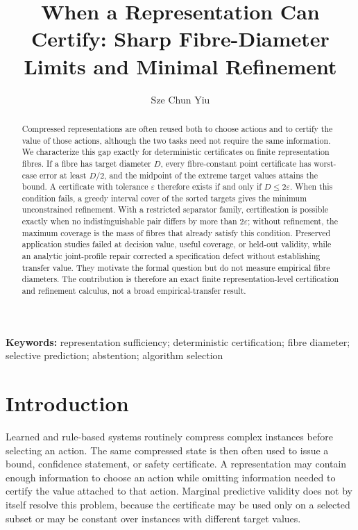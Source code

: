 \documentclass[10pt]{article}
\title{When a Representation Can Certify: Sharp Fibre-Diameter Limits and Minimal Refinement}
\author{Sze Chun Yiu}
\newcommand{\1}{\mathbf{1}}
\begin{document}
\raggedbottom
\maketitle

\begin{abstract}
Compressed representations are often reused both to choose actions and to certify the value of those actions, although the two tasks need not require the same information. We characterize this gap exactly for deterministic certificates on finite representation fibres. If a fibre has target diameter $D$, every fibre-constant point certificate has worst-case error at least $D/2$, and the midpoint of the extreme target values attains the bound. A certificate with tolerance $\varepsilon$ therefore exists if and only if $D\leq 2\varepsilon$. When this condition fails, a greedy interval cover of the sorted targets gives the minimum unconstrained refinement. With a restricted separator family, certification is possible exactly when no indistinguishable pair differs by more than $2\varepsilon$; without refinement, the maximum coverage is the mass of fibres that already satisfy this condition. Preserved application studies failed at decision value, useful coverage, or held-out validity, while an analytic joint-profile repair corrected a specification defect without establishing transfer value. They motivate the formal question but do not measure empirical fibre diameters. The contribution is therefore an exact finite representation-level certification and refinement calculus, not a broad empirical-transfer result.
\end{abstract}

\noindent\textbf{Keywords:} representation sufficiency; deterministic certification; fibre diameter; selective prediction; abstention; algorithm selection

\section{Introduction}
Learned and rule-based systems routinely compress complex instances before selecting an action. The same compressed state is then often used to issue a bound, confidence statement, or safety certificate. A representation may contain enough information to choose an action while omitting information needed to certify the value attached to that action. Marginal predictive validity does not by itself resolve this problem, because the certificate may be used only on a selected subset or may be constant over instances with different target values.
\end{document}
